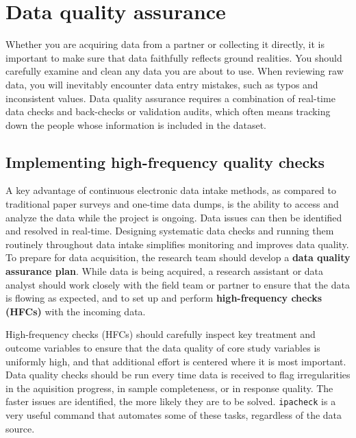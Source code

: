 \section{Data quality assurance}

Whether you are acquiring data from a partner or collecting it directly,
it is important to make sure that data faithfully reflects ground realities.
You should carefully examine and clean any data you are about to use.
When reviewing raw data, you will inevitably encounter data entry mistakes,
such as typos and inconsistent values.
Data quality assurance requires a combination of real-time data checks
and back-checks or validation audits, which often means tracking down
the people whose information is included in the dataset.

\subsection{Implementing high-frequency quality checks}

A key advantage of continuous electronic data intake methods,
as compared to traditional paper surveys and one-time data dumps,
is the ability to access and analyze the data while the project is ongoing.
Data issues can then be identified and resolved in real-time.
Designing systematic data checks and running them routinely throughout data intake
simplifies monitoring and improves data quality.
To prepare for data acquisition,
the research team should develop a \textbf{data quality assurance plan}.
While data is being acquired,
a research assistant or data analyst should work closely with the field team or partner
to ensure that the data is flowing as expected,
and to set up and perform \textbf{high-frequency checks (HFCs)} with the incoming data.

High-frequency checks (HFCs) should carefully inspect key treatment and outcome variables
to ensure that the data quality of core study variables is uniformly high,
and that additional effort is centered where it is most important.
Data quality checks should be run every time data is received 
to flag irregularities in the aquisition progress, in sample completeness, or in response quality.
The faster issues are identified, the more likely they are to be solved.
\texttt{ipacheck}
is a very useful command that automates some of these tasks,
regardless of the data source.

